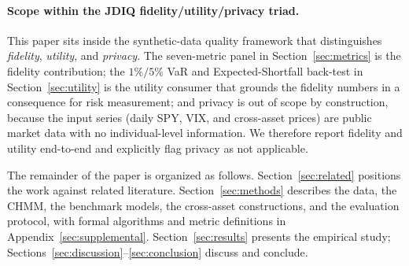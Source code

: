 \paragraph{Scope within the JDIQ fidelity/utility/privacy triad.}
This paper sits inside the synthetic-data quality framework that distinguishes \emph{fidelity}, \emph{utility}, and \emph{privacy}.
The seven-metric panel in Section~\ref{sec:metrics} is the fidelity contribution; the $1\%/5\%$ VaR and Expected-Shortfall back-test in Section~\ref{sec:utility} is the utility consumer that grounds the fidelity numbers in a consequence for risk measurement; and privacy is out of scope by construction, because the input series (daily SPY, VIX, and cross-asset prices) are public market data with no individual-level information.
We therefore report fidelity and utility end-to-end and explicitly flag privacy as not applicable.

The remainder of the paper is organized as follows.
Section~\ref{sec:related} positions the work against related literature.
Section~\ref{sec:methods} describes the data, the CHMM, the benchmark models, the cross-asset constructions, and the evaluation protocol, with formal algorithms and metric definitions in Appendix~\ref{sec:supplemental}.
Section~\ref{sec:results} presents the empirical study; Sections~\ref{sec:discussion}--\ref{sec:conclusion} discuss and conclude.
